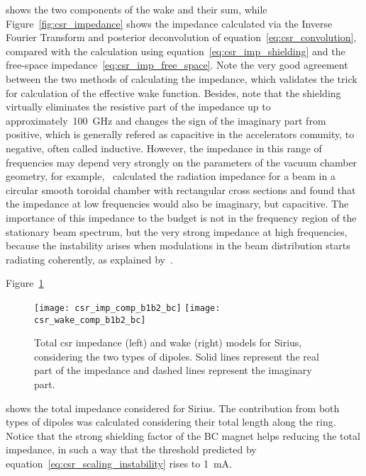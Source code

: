     shows the two components of the wake and their sum, while Figure~\ref{fig:csr_impedance} shows the impedance calculated via the Inverse Fourier Transform and posterior deconvolution of equation~\eqref{eq:csr_convolution}, compared with the calculation using equation~\eqref{eq:csr_imp_shielding} and the free-space impedance~\eqref{eq:csr_imp_free_space}. Note the very good agreement between the two methods of calculating the impedance, which validates the trick for calculation of the effective wake function.
    Besides, note that the shielding virtually eliminates the resistive part of the impedance up to approximately~\SI{100}{\giga\hertz} and changes the sign of the imaginary part from positive, which is generally refered as capacitive in the accelerators comunity, to negative, often called inductive. However, the impedance in this range of frequencies may depend very strongly on the parameters of the vacuum chamber geometry, for example,~ calculated the radiation impedance for a beam in a circular smooth toroidal chamber with rectangular cross sections and found that the impedance at low frequencies would also be imaginary, but capacitive. The importance of this impedance to the budget is not in the frequency region of the stationary beam spectrum, but the very strong impedance at high frequencies, because the instability arises when modulations in the beam distribution starts radiating coherently, as explained by~.

    Figure~\ref{fig:csr_total_impedance}
    \begin{figure}
        \centering
        \texttt{[image: csr\_imp\_comp\_b1b2\_bc]}\hfill
        \texttt{[image: csr\_wake\_comp\_b1b2\_bc]}
        \caption{Total \gls{csr} impedance (left) and wake (right) models for Sirius, considering the two types of dipoles. Solid lines represent the real part of the impedance and dashed lines represent the imaginary part.}
        \label{fig:csr_total_impedance}
    \end{figure}
    shows the total impedance considered for Sirius. The contribution from both types of dipoles was calculated considering their total length along the ring. Notice that the strong shielding factor of the BC magnet helps reducing the total impedance, in such a way that the threshold predicted by equation~\eqref{eq:csr_scaling_instability} rises to \SI{1}{\milli\ampere}.


